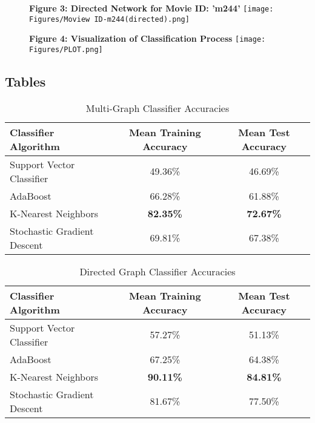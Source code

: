 \documentclass{article} %
\begin{document}
\begin{figure}[ht]
    \centering
    \textbf{Figure 3: Directed Network for Movie ID: 'm244'}
    \texttt{[image: Figures/Moview ID-m244(directed).png]}
\end{figure}

\newpage
\begin{figure}[ht]
    \centering
    \textbf{Figure 4:  Visualization of Classification Process}
    \texttt{[image: Figures/PLOT.png]}
\end{figure}

\newpage
\subsection{Tables}

\begin{table}[ht]
\centering
\caption{Multi-Graph Classifier Accuracies}
\begin{tabular}{|l|c|c|}
\hline
\textbf{Classifier Algorithm} & \textbf{Mean Training Accuracy} & \textbf{Mean Test Accuracy} \\ \hline
Support Vector Classifier     & 49.36\%                         & 46.69\%                     \\ \hline
AdaBoost                      & 66.28\%                         & 61.88\%                     \\ \hline
K-Nearest Neighbors           & \textbf{82.35\%}                & \textbf{72.67\%}            \\ \hline
Stochastic Gradient Descent   & 69.81\%                         & 67.38\%                     \\ \hline
\end{tabular}
\end{table}


\begin{table}[ht]
\centering
\caption{Directed Graph Classifier Accuracies}
\begin{tabular}{|l|c|c|}
\hline
\textbf{Classifier Algorithm} & \textbf{Mean Training Accuracy} & \textbf{Mean Test Accuracy} \\ \hline
Support Vector Classifier     & 57.27\%                         & 51.13\%                     \\ \hline
AdaBoost                      & 67.25\%                         & 64.38\%                     \\ \hline
K-Nearest Neighbors           & \textbf{90.11\%}                & \textbf{84.81\%}            \\ \hline
Stochastic Gradient Descent   & 81.67\%                         & 77.50\%                     \\ \hline
\end{tabular}
\end{table}
\end{document}
